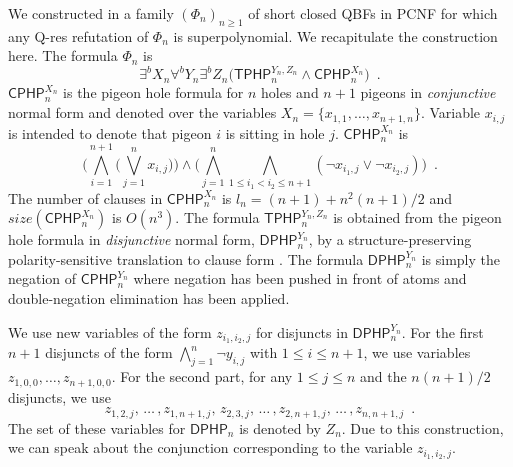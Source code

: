 \documentclass{llncs}
\newcommand{\qres}{\mbox{\sf Q-res}}
\newcommand{\size}[1]{\mathit{size}(#1)}
\newcommand{\PHPText}{CPHP}
\newcommand{\PHPTextp}{DPHP}
\newcommand{\TPHPTextp}{TPHP}
\newcommand{\PHPVar}[2]{\mbox{$\mathsf{\PHPText}_{#1}^{#2}$}}
\newcommand{\PHPpVar}[2]{\mbox{$\mathsf{\PHPTextp}_{#1}^{#2}$}}
\newcommand{\TPHPpVar}[2]{\mbox{$\mathsf{\TPHPTextp}_{#1}^{#2}$}}
\begin{document}
We constructed in \cite{DBLP:conf/sat/Egly12} a family
$(\Phi_n)_{n\geq 1}$ of short closed QBFs in PCNF for which any
\qres{} refutation of $\Phi_n$ is superpolynomial. We recapitulate the construction here. The formula $\Phi_n$
is
\begin{equation}\label{eqn:Phi_n}
\exists^b X_n \forall^b Y_n \exists^b Z_n
\big( \TPHPpVar{n}{Y_n,Z_n}  \land \PHPVar{n}{X_n} \big)\enspace .
\end{equation}
$\PHPVar{n}{X_n}$ is the pigeon hole formula for $n$ holes and $n+1$
pigeons in \emph{conjunctive} normal form and denoted over the
variables $X_n = \{x_{1,1} , \ldots , x_{n+1, n}\}$. Variable
$x_{i,j}$ is intended to denote that pigeon $i$ is sitting in hole
$j$. \PHPVar{n}{X_n} is
\begin{equation}
  \nonumber
  \bigg(\bigwedge_{i=1}^{n+1} \big(\bigvee_{j=1}^{n} x_{i,j} \big) \bigg) \land 
  \bigg(\bigwedge_{j=1}^{n} \bigwedge_{1\leq i_1<i_2\leq n+1} 
  (\neg x_{i_1,j} \lor \neg x_{i_2,j})\bigg)\enspace .
\end{equation}
The number of clauses in \PHPVar{n}{X_n} is $l_n = (n+1) + n^2(n+1)/2$
and $\size{\PHPVar{n}{X_n}}$ is $O(n^3)$. The formula
\TPHPpVar{n}{Y_n,Z_n} is obtained from the pigeon hole formula in
\emph{disjunctive} normal form, \PHPpVar{n}{Y_n}, by a
structure-preserving polarity-sensitive translation to clause form
\cite{DBLP:journals/jsc/PlaistedG86}. The formula \PHPpVar{n}{Y_n} is
simply the negation of $\PHPVar{n}{Y_n}$ where negation has been
pushed in front of atoms and double-negation elimination has been
applied.

We use new variables of the form $z_{i_1,i_2,j}$ for disjuncts in
\PHPpVar{n}{Y_n}.  For the first $n+1$ disjuncts of the form
$\bigwedge_{j=1}^{n} \neg y_{i,j}$
with $1\leq i\leq n+1$, we use variables $z_{1,0,0}, \ldots ,
z_{n+1,0,0}$. For the second part, for any $1\leq j\leq n$ and the
$n(n+1)/2$ disjuncts, we use
\begin{equation}
\label{eqn:varset2}
z_{1,2,j}, \, \ldots \, , z_{1,n+1,j}, \, z_{2,3,j}, \, \ldots \, , 
z_{2,n+1,j}, \, \ldots \, , z_{n,n+1,j}\enspace .
\end{equation}
The set of these variables for $\PHPpVar{n}{\mbox{}}$ is denoted by
$Z_n$.  Due to this construction, we can speak about the conjunction
corresponding to the variable $z_{i_1,i_2,j}$.
\end{document}
